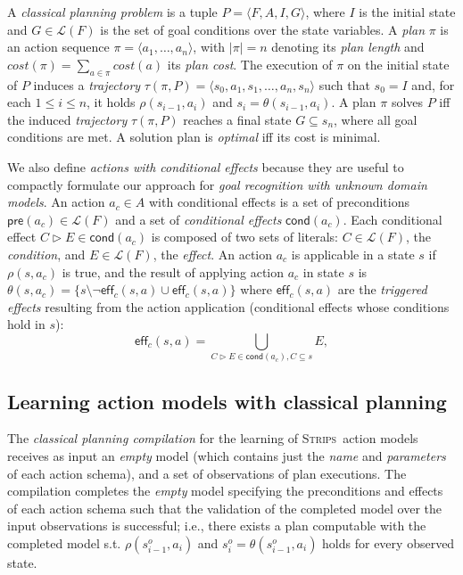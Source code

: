 \documentclass{article}
\newcommand{\tup}[1]{{\langle #1 \rangle}}
\newcommand{\pre}{\mathsf{pre}}     %
\newcommand{\eff}{\mathsf{eff}}     %
\newcommand{\cond}{\mathsf{cond}}   %
\newcommand{\strips}{\textsc{Strips}}
\begin{document}
A {\em classical planning problem} is a tuple $P=\tup{F,A,I,G}$, where $I$ is the initial state and $G\in\mathcal{L}(F)$ is the set of goal conditions over the state variables. A {\em plan} $\pi$ is an action sequence $\pi=\tup{a_1, \ldots, a_n}$, with $|\pi|=n$ denoting its {\em plan length} and $cost(\pi)=\sum_{a\in\pi} cost(a)$ its {\em plan cost}. The execution of $\pi$ on the initial state of $P$ induces a {\em trajectory} $\tau(\pi,P)=\tup{s_0, a_1, s_1, \ldots, a_n, s_n}$ such that $s_0=I$ and, for each {\small $1\leq i\leq n$}, it holds $\rho(s_{i-1},a_i)$ and $s_i=\theta(s_{i-1},a_i)$. A plan $\pi$ solves $P$ iff the induced {\em trajectory} $\tau(\pi,P)$ reaches a final state $G \subseteq s_n$, where all goal conditions are met. A solution plan is {\em optimal} iff its cost is minimal.

We also define {\em actions with conditional effects} because they are useful to compactly formulate our approach for {\em goal recognition with unknown domain models}. An action $a_c\in A$ with conditional effects is a set of preconditions $\pre(a_c)\in\mathcal{L}(F)$ and a set of {\em conditional effects} $\cond(a_c)$. Each conditional effect $C\rhd E\in\cond(a_c)$ is composed of two sets of literals: $C\in\mathcal{L}(F)$, the {\em condition}, and $E\in\mathcal{L}(F)$, the {\em effect}. An action $a_c$ is applicable in a state $s$ if $\rho(s,a_c)$ is true, and the result of applying action $a_c$ in state $s$ is $\theta(s,a_c)=\{s\setminus\neg\eff_c(s,a)\cup\eff_c(s,a)\}$ where $\eff_c(s,a)$ are the {\em triggered effects} resulting from the action application (conditional effects whose conditions hold in $s$):
\[
\eff_c(s,a)=\bigcup_{C\rhd E\in\cond(a_c),C\subseteq s} E,
\]

\subsection{Learning action models with classical planning}
The {\em classical planning compilation} for the learning of \strips\ action models~\cite{aineto2018learning} receives as input an {\em empty} model (which contains just the {\em name} and {\em parameters} of each action schema), and a set of observations of plan executions. The compilation completes the {\em empty} model specifying the preconditions and effects of each action schema such that the validation of the completed model over the input observations is successful; i.e., there exists a plan computable with the completed model s.t. $\rho(s_{i-1}^o,a_i)$ and $s_i^o=\theta(s_{i-1}^o,a_i)$ holds for every observed state.
\end{document}
